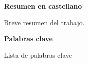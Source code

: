
\newpage

\thispagestyle{empty}

\begin{center}

{\bf \Huge Resumen en castellano}

  \end{center}
\vspace{1cm}

Breve resumen del trabajo.

\vspace{1cm}


\begin{center}

{\bf \Large Palabras clave}

   \end{center}

   \vspace{0.5cm}
   
   Lista de palabras clave
   


